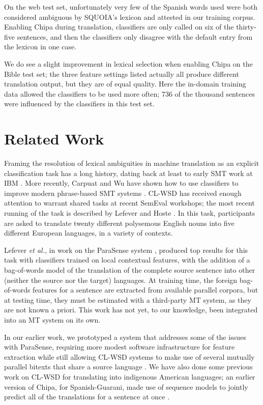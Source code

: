 \documentclass[10pt, a4paper]{article}
\begin{document}
On the web test set, unfortunately very few of the Spanish words used were both
considered ambiguous by SQUOIA's lexicon and attested in our training corpus.
Enabling Chipa during translation, classifiers are only called on six of the
thirty-five sentences, and then the classifiers only disagree with the default
entry from the lexicon in one case.

We do see a slight improvement in lexical selection when enabling Chipa on the
Bible test set; the three feature settings listed actually all produce
different translation output, but they are of equal quality. Here the in-domain
training data allowed the classifiers to be used more often; 736 of the
thousand sentences were influenced by the classifiers in this test set.

\section{Related Work}
Framing the resolution of lexical ambiguities in machine translation
as an explicit classification
task has a long history, dating back at least to early SMT work at IBM
\cite{Brown91word-sensedisambiguation}.  More recently, Carpuat and Wu have
shown how to use classifiers to improve modern phrase-based SMT systems
\cite{carpuatpsd}.
CL-WSD has received enough attention to warrant shared tasks at recent SemEval
workshops; the most recent running of the task is described by Lefever and
Hoste .
In this task, participants are asked to translate twenty different polysemous
English nouns into five different European languages, in a variety of contexts.

Lefever \emph{et al.}, in work on the ParaSense system
, produced top results for
this task with classifiers trained on local contextual features, with the 
addition of a bag-of-words model of the translation of the complete source
sentence into other (neither the source nor the target) languages. At training
time, the foreign bag-of-words features for a sentence are extracted from
available parallel corpora, but at testing time, they must be
estimated with a third-party MT system, as they are not known a priori.
This work has not yet, to our knowledge, been integrated into an MT system
on its own.

In our earlier work, we prototyped a system that addresses some of the issues
with ParaSense, requiring more modest software infrastructure for feature
extraction while still allowing CL-WSD systems to make use of several mutually
parallel bitexts that share a source language
\cite{rudnick-liu-gasser:2013:SemEval-2013}.
We have also done some previous work on CL-WSD for translating into indigenous
American languages; an earlier version of Chipa, for Spanish-Guarani, made use
of sequence models to jointly predict all of the translations for a sentence at
once \cite{rudnick-gasser:2013:HyTra}.
\end{document}

